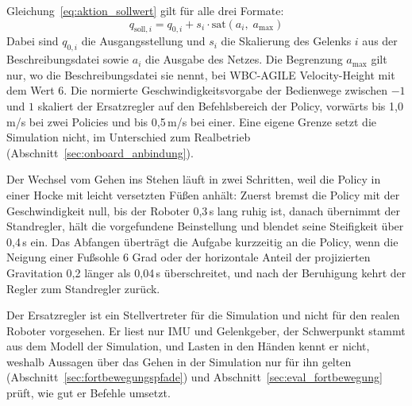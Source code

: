 Gleichung~\ref{eq:aktion_sollwert} gilt für alle drei Formate:
\begin{equation}
  q_{\mathrm{soll},i} = q_{0,i} + s_i \cdot \mathrm{sat}\!\left( a_i,\; a_{\max} \right)
  \label{eq:aktion_sollwert}
\end{equation}
Dabei sind $q_{0,i}$ die Ausgangsstellung und $s_i$ die Skalierung des Gelenks $i$ aus der Beschreibungsdatei sowie $a_i$ die Ausgabe des Netzes.
Die Begrenzung $a_{\max}$ gilt nur, wo die Beschreibungsdatei sie nennt, bei WBC-AGILE Velocity-Height mit dem Wert 6.
Die normierte Geschwindigkeitsvorgabe der Bedienwege zwischen $-1$ und $1$ skaliert der Ersatzregler auf den Befehlsbereich der Policy, vorwärts bis 1,0\,m/s bei zwei Policies und bis 0,5\,m/s bei einer.
Eine eigene Grenze setzt die Simulation nicht, im Unterschied zum Realbetrieb (Abschnitt~\ref{sec:onboard_anbindung}).

Der Wechsel vom Gehen ins Stehen läuft in zwei Schritten, weil die Policy in einer Hocke mit leicht versetzten Füßen anhält: Zuerst bremst die Policy mit der Geschwindigkeit null, bis der Roboter 0,3\,s lang ruhig ist, danach übernimmt der Standregler, hält die vorgefundene Beinstellung und blendet seine Steifigkeit über 0,4\,s ein.
Das Abfangen überträgt die Aufgabe kurzzeitig an die Policy, wenn die Neigung einer Fußsohle 6 Grad oder der horizontale Anteil der projizierten Gravitation 0,2 länger als 0,04\,s überschreitet, und nach der Beruhigung kehrt der Regler zum Standregler zurück.

Der Ersatzregler ist ein Stellvertreter für die Simulation und nicht für den realen Roboter vorgesehen.
Er liest nur IMU und Gelenkgeber, der Schwerpunkt stammt aus dem Modell der Simulation, und Lasten in den Händen kennt er nicht, weshalb Aussagen über das Gehen in der Simulation nur für ihn gelten (Abschnitt~\ref{sec:fortbewegungspfade}) und Abschnitt~\ref{sec:eval_fortbewegung} prüft, wie gut er Befehle umsetzt.

